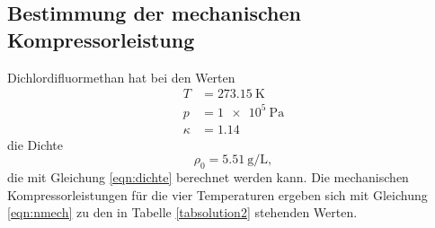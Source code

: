 \subsection{Bestimmung der mechanischen Kompressorleistung}
Dichlordifluormethan hat bei den Werten
\begin{align*}
    T &= \SI{273.15}{\kelvin} \\
    p &= \SI{1e5}{\pascal} \\
    \kappa &= \num{1.14}
\end{align*}
die Dichte 
\begin{equation*}
    \rho_0 = \SI{5.51}{\gram\per\liter},
\end{equation*}
die mit Gleichung \eqref{eqn:dichte} berechnet werden kann.
Die mechanischen Kompressorleistungen für die vier Temperaturen
ergeben sich mit Gleichung \eqref{eqn:nmech}
zu den in Tabelle \ref{tabsolution2} stehenden Werten.
